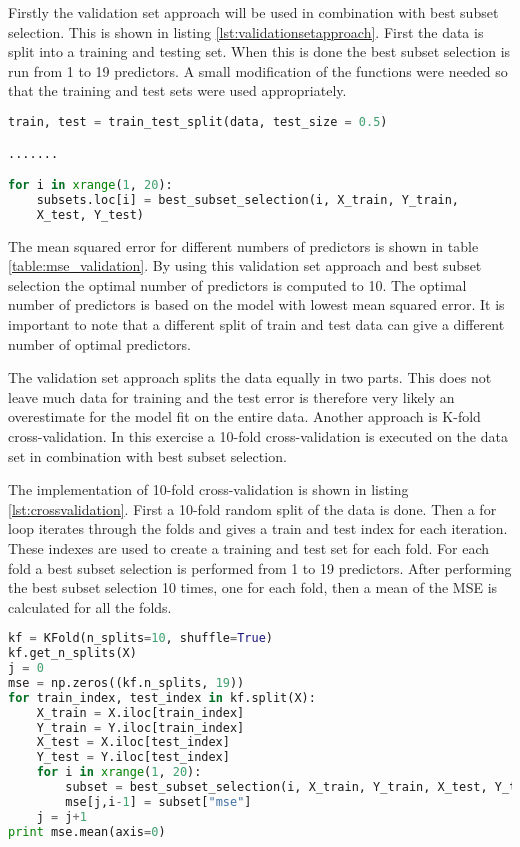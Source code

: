 Firstly the validation set approach will be used in combination with best subset selection. This is shown in listing \ref{lst:validationsetapproach}. First the data is split into a training and testing set. When this is done the best subset selection is run from 1 to 19 predictors. A small modification of the functions were needed so that the training and test sets were used appropriately.

\begin{lstlisting}[language=Python, label=lst:validationsetapproach, caption=Validation set approach for choosing predictors]
train, test = train_test_split(data, test_size = 0.5)

.......

for i in xrange(1, 20):
	subsets.loc[i] = best_subset_selection(i, X_train, Y_train,
	X_test, Y_test)
\end{lstlisting}

The mean squared error for different numbers of predictors is shown in table \ref{table:mse_validation}. By using this validation set approach and best subset selection the optimal number of predictors is computed to 10. The optimal number of predictors is based on the model with lowest mean squared error. It is important to note that a different split of train and test data can give a different number of optimal predictors.

The validation set approach splits the data equally in two parts. This does not leave much data for training and the test error is therefore very likely an overestimate for the model fit on the entire data. Another approach is K-fold cross-validation. In this exercise a 10-fold cross-validation is executed on the data set in combination with best subset selection.

The implementation of 10-fold cross-validation is shown in listing \ref{lst:crossvalidation}. First a 10-fold random split of the data is done. Then a for loop iterates through the folds and gives a train and test index for each iteration. These indexes are used to create a training and test set for each fold. For each fold a best subset selection is performed from 1 to 19 predictors. After performing the best subset selection 10 times, one for each fold, then a mean of the MSE is calculated for all the folds.

\begin{lstlisting}[language=Python, label=lst:crossvalidation, caption=Cross-validation and best subset selection for choosing predictors]
kf = KFold(n_splits=10, shuffle=True)
kf.get_n_splits(X)
j = 0
mse = np.zeros((kf.n_splits, 19))
for train_index, test_index in kf.split(X):
    X_train = X.iloc[train_index]
    Y_train = Y.iloc[train_index]
    X_test = X.iloc[test_index]
    Y_test = Y.iloc[test_index]
    for i in xrange(1, 20):
		subset = best_subset_selection(i, X_train, Y_train, X_test, Y_test)
        mse[j,i-1] = subset["mse"]
    j = j+1
print mse.mean(axis=0)    
\end{lstlisting}


